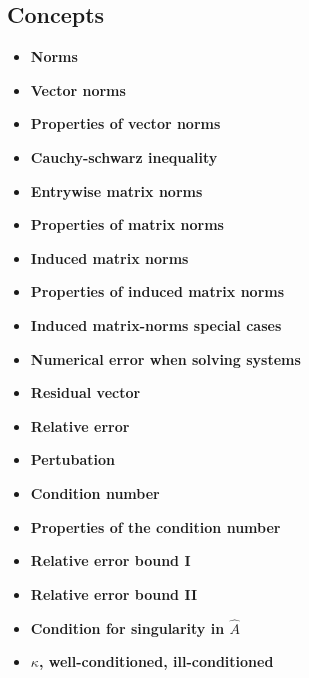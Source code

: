 \documentclass{report}
\begin{document}
    \subsection{Concepts}
    \begin{itemize}
        \item \textbf{Norms}
        \item \textbf{Vector norms}
        \item \textbf{Properties of vector norms}
        \item \textbf{Cauchy-schwarz inequality}
        \item \textbf{Entrywise matrix norms}
        \item \textbf{Properties of matrix norms}
        \item \textbf{Induced matrix norms}
        \item \textbf{Properties of induced matrix norms}
        \item \textbf{Induced matrix-norms special cases}
        \item \textbf{Numerical error when solving systems}
        \item \textbf{Residual vector}
        \item \textbf{Relative error}
        \item \textbf{Pertubation}
        \item \textbf{Condition number}
        \item \textbf{Properties of the condition number}
        \item \textbf{Relative error bound I}
        \item \textbf{Relative error bound II}
        \item \textbf{Condition for singularity in $\hat{A}$}
        \item \textbf{$\kappa$, well-conditioned, ill-conditioned}
    \end{itemize}

    \bigbreak \noindent 
\end{document}

